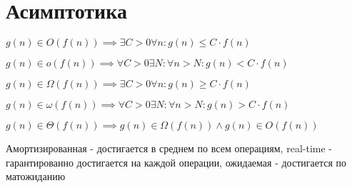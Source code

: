 \section{Асимптотика}

$g(n) \in O(f(n)) \implies \exists C > 0 \forall n : g(n) \leq C \cdot f(n)$

$g(n) \in o(f(n)) \implies \forall C > 0 \exists N : \forall n > N : g(n) < C \cdot f(n)$

$g(n) \in \Omega(f(n)) \implies \exists C > 0 \forall n : g(n) \geq C \cdot f(n)$

$g(n) \in \omega(f(n)) \implies \forall C > 0 \exists N : \forall n > N : g(n) > C \cdot f(n)$

$g(n) \in \Theta(f(n)) \implies g(n) \in \Omega(f(n)) \land g(n) \in O(f(n))$

Амортизированная - достигается в среднем по всем операциям, real-time - гарантированно достигается на каждой операции, ожидаемая - достигается по матожиданию
